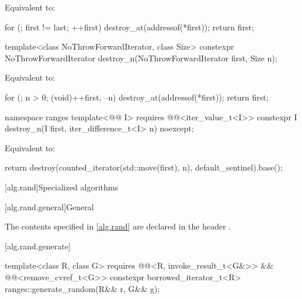 \begin{itemdescr}
\pnum
\effects
Equivalent to:
\begin{codeblock}
for (; first != last; ++first)
  destroy_at(addressof(*first));
return first;
\end{codeblock}
\end{itemdescr}

%
\begin{itemdecl}
template<class NoThrowForwardIterator, class Size>
  constexpr NoThrowForwardIterator destroy_n(NoThrowForwardIterator first, Size n);
\end{itemdecl}

\begin{itemdescr}
\pnum
\effects
Equivalent to:
\begin{codeblock}
for (; n > 0; (void)++first, --n)
  destroy_at(addressof(*first));
return first;
\end{codeblock}
\end{itemdescr}

%
\begin{itemdecl}
namespace ranges {
  template<@@ I>
    requires @@<iter_value_t<I>>
    constexpr I destroy_n(I first, iter_difference_t<I> n) noexcept;
}
\end{itemdecl}

\begin{itemdescr}
\pnum
\effects
Equivalent to:
\begin{codeblock}
return destroy(counted_iterator(std::move(first), n), default_sentinel).base();
\end{codeblock}
\end{itemdescr}

[alg.rand]{Specialized  algorithms}

[alg.rand.general]{General}

\pnum
The contents specified in \ref{alg.rand}
are declared in the header .

[alg.rand.generate]{}

%
\begin{itemdecl}
template<class R, class G>
  requires @@<R, invoke_result_t<G&>> && @@<remove_cvref_t<G>>
  constexpr borrowed_iterator_t<R> ranges::generate_random(R&& r, G&& g);
\end{itemdecl}

